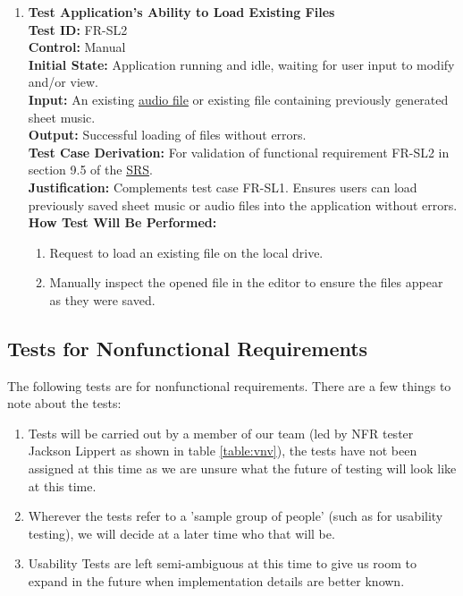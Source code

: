 \documentclass[12pt, titlepage]{article}
\begin{document}
\begin{enumerate}
    \item \textbf{Test Application’s Ability to Load Existing Files} \\
      \newline
      \textbf{Test ID:} FR-SL2 \\
      \textbf{Control:} Manual \\
      \textbf{Initial State:} Application running and idle, waiting for user input to modify and/or view. \\
      \textbf{Input:} An existing \href{https://github.com/emilyperica/ScoreGen/blob/main/test/TestingDatasets/piano-samples/sample-scales/c-major-scale-on-treble-clef.wav}{audio file} or existing file containing previously generated sheet music. \\
      \textbf{Output:} Successful loading of files without errors. \\
      \textbf{Test Case Derivation:} For validation of functional requirement FR-SL2 in section 9.5 of the 
      \href{https://github.com/emilyperica/ScoreGen/blob/main/docs/SRS-Volere/SRS.pdf}{SRS}. \\
      \textbf{Justification:} Complements test case FR-SL1. Ensures users can load previously saved sheet music or 
      audio files into the application without errors.\\
      \textbf{How Test Will Be Performed:}
      \begin{enumerate}
          \item Request to load an existing file on the local drive.
          \item Manually inspect the opened file in the editor to ensure the files appear as they were saved.
      \end{enumerate}
  \end{enumerate}
\subsection{Tests for Nonfunctional Requirements}

The following tests are for nonfunctional requirements. There are a few things to note about the tests:
\begin{enumerate}
  \item Tests will be carried out by a member of our team (led by NFR tester Jackson Lippert as shown in table \ref{table:vnv}), 
  the tests have not been assigned at this time as we are unsure what the future of testing will look like at this time.
  \item Wherever the tests refer to a 'sample group of people' (such as for usability testing), we will decide at a later time 
  who that will be.
  \item Usability Tests are left semi-ambiguous at this time to give us room to expand in the future when implementation details 
  are better known.
\end{enumerate}
\end{document}
